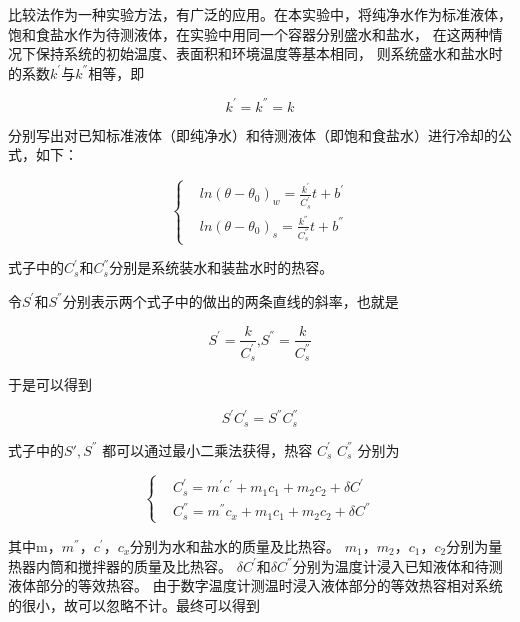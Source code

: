 \documentclass{ctexart}
\begin{document}
  比较法作为一种实验方法，有广泛的应用。在本实验中，将纯净水作为标准液体，
  饱和食盐水作为待测液体，在实验中用同一个容器分别盛水和盐水，
  在这两种情况下保持系统的初始温度、表面积和环境温度等基本相同，
  则系统盛水和盐水时的系数$k^{'}$与$k^{''}$相等，即

  $$k^{'} = k^{''} = k$$

  分别写出对已知标准液体（即纯净水）和待测液体（即饱和食盐水）进行冷却的公式，如下：

  \begin{equation}
  \left\{  
  \begin{aligned}
      & ln(\theta - \theta_{0}) _{w} = \frac{k^{'}}{C^{'}_{s}} t + b^{'} \\
      & ln(\theta - \theta_{0}) _{s} = \frac{k^{''}}{C^{''}_{s}} t + b^{''}
  \end{aligned}
  \right.
  \end{equation}

  式子中的$C^{'}_{s}$和$C^{''}_{s}$分别是系统装水和装盐水时的热容。

  令$S^{'}$和$S^{''}$分别表示两个式子中的做出的两条直线的斜率，也就是

  \begin{equation}
    S^{'} = \frac{k}{C^{'}_{s}} \mbox{,} S^{''} = \frac{k}{C^{''}_{s}}
  \end{equation}

  于是可以得到

  \begin{equation}
    S^{'} C^{'}_{s} = S^{''} C^{''}_{s}
  \end{equation}

  式子中的$S' , S^{''}$ 都可以通过最小二乘法获得，热容 $C^{'}_{s}$ $C^{''}_{s}$ 分别为

  \begin{equation}
  \left\{
  \begin{aligned}
      & C^{'}_{s} = m^{'}c^{'}+m_{1}c_{1}+m_{2}c_{2}+\delta C^{'} \\
      & C^{''}_{s} = m^{''}c_{x}+m_{1}c_{1}+m_{2}c_{2}+\delta C^{''}
  \end{aligned}
  \right.
  \end{equation}

    其中m，$m^{''}$，$c^{'}$，$c_{x}$分别为水和盐水的质量及比热容。
    $m_{1}$，$m_{2}$，$c_{1}$，$c_{2}$分别为量热器内筒和搅拌器的质量及比热容。
    $\delta C^{'}$和$\delta C^{''}$分别为温度计浸入已知液体和待测液体部分的等效热容。
    由于数字温度计测温时浸入液体部分的等效热容相对系统的很小，故可以忽略不计。最终可以得到
\end{document}

